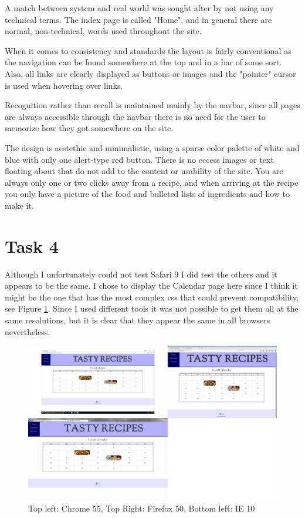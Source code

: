 \documentclass[a4paper]{scrreprt}
\begin{document}
A match between system and real world was sought after by not using any technical terms. The index page is called "Home", and in general there are normal, non-technical, words used throughout the site.

When it comes to consistency and standards the layout is fairly conventional as the navigation can be found somewhere at the top and in a bar of some sort. Also, all links are clearly displayed as buttons or images and the "pointer" cursor is used when hovering over links.

Recognition rather than recall is maintained mainly by the navbar, since all pages are always accessible through the navbar there is no need for the user to memorize how they got somewhere on the site.

The design is aestethic and minimalistic, using a sparse color palette of white and blue with only one alert-type red button. There is no eccess images or text floating about that do not add to the content or usability of the site. You are always only one or two clicks away from a recipe, and when arriving at the recipe you only have a picture of the food and bulleted lists of ingredients and how to make it.

\section{Task 4}

Although I unfortunately could not test Safari 9 I did test the others and it appears to be the same. I chose to display the Calendar page here since I think it might be the one that has the most complex css that could prevent compatibility, see Figure \ref{fig:compcheck}. Since I used different tools it was not possible to get them all at the same resolutions, but it is clear that they appear the same in all browsers nevertheless.

\begin{figure}[h!]
  \begin{center}
    \includegraphics[scale=0.41]{compatability_check.jpg}
    \caption{Top left: Chrome 55, Top Right: Firefox 50, Bottom left: IE 10}
    \label{fig:compcheck}
  \end{center}
\end{figure}
\end{document}
